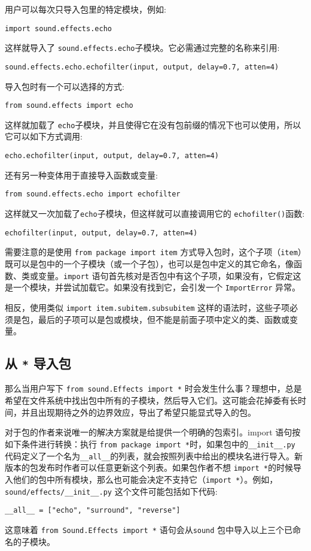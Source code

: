 用户可以每次只导入包里的特定模块，例如:
\begin{lstlisting}
import sound.effects.echo
\end{lstlisting}
这样就导入了 \texttt{sound.effects.echo}子模块。它必需通过完整的名称来引用:
\begin{lstlisting}
sound.effects.echo.echofilter(input, output, delay=0.7, atten=4)
\end{lstlisting}
导入包时有一个可以选择的方式:
\begin{lstlisting}
from sound.effects import echo
\end{lstlisting}
这样就加载了 \texttt{echo}子模块，并且使得它在没有包前缀的情况下也可以使用，所以它可以如下方式调用:
\begin{lstlisting}
echo.echofilter(input, output, delay=0.7, atten=4)
\end{lstlisting}
还有另一种变体用于直接导入函数或变量:
\begin{lstlisting}
from sound.effects.echo import echofilter
\end{lstlisting}
这样就又一次加载了\texttt{echo}子模块，但这样就可以直接调用它的 \texttt{echofilter()}函数:
\begin{lstlisting}
echofilter(input, output, delay=0.7, atten=4)
\end{lstlisting}
需要注意的是使用 \texttt{from package import item} 方式导入包时，这个子项（\texttt{item}）既可以是包中的一个子模块（或一个子包），也可以是包中定义的其它命名，像函数、类或变量。\texttt{import} 语句首先核对是否包中有这个子项，如果没有，它假定这是一个模块，并尝试加载它。如果没有找到它，会引发一个 \texttt{ImportError} 异常。

相反，使用类似 \texttt{import item.subitem.subsubitem} 这样的语法时，这些子项必须是包，最后的子项可以是包或模块，但不能是前面子项中定义的类、函数或变量。
\subsection{从 \texttt{*} 导入包}
那么当用户写下 \texttt{from sound.Effects import *} 时会发生什么事？理想中，总是希望在文件系统中找出包中所有的子模块，然后导入它们。这可能会花掉委有长时间，并且出现期待之外的边界效应，导出了希望只能显式导入的包。

对于包的作者来说唯一的解决方案就是给提供一个明确的包索引。import 语句按如下条件进行转换：执行 \texttt{from package import *}时，如果包中的\cprotect\texttt{\verb|__init__|.py} 代码定义了一个名为\verb|__all__|的列表，就会按照列表中给出的模块名进行导入。新版本的包发布时作者可以任意更新这个列表。如果包作者不想 \texttt{import *}的时候导入他们的包中所有模块，那么也可能会决定不支持它（\texttt{import *}）。例如， \cprotect\texttt{sound/effects/\verb|__init__|.py} 这个文件可能包括如下代码:
\begin{lstlisting}
__all__ = ["echo", "surround", "reverse"]
\end{lstlisting}
这意味着 \texttt{from Sound.Effects import *} 语句会从\texttt{sound} 包中导入以上三个已命名的子模块。

